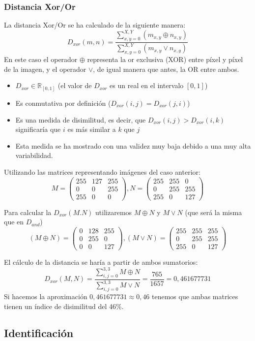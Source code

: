 \subsubsection{Distancia Xor/Or}
La distancia Xor/Or se ha calculado de la siguiente manera:
\[
D_{xor}(m,n)=\frac{ \sum_{x,y=0}^{X,Y}(m_{x,y} \oplus n_{x,y}) }{ \sum_{x,y=0}^{X,Y}(m_{x,y} \vee n_{x,y}) }
\]
En este caso el operador $\oplus$ representa la or exclusiva (XOR) entre píxel y píxel de la imagen, y el operador $\vee$, de igual manera que antes, la OR entre ambos.
\begin{itemize}
	\item{$D_{xor}\in\mathbb{R}_{\left[0,1\right]}$ (el valor de $D_{xor}$ es un real en el intervalo $\left[0,1\right]$)} 
	\item{Es conmutativa por definición ($D_{xor}(i,j)=D_{xor}(j,i)$)}
	\item{Es una medida de disimilitud, es decir, que $D_{xor}(i,j) > D_{xor} (i,k)$ significaría que $i$ es más similar a $k$ que $j$}
	\item{Esta medida se ha mostrado con una validez muy baja debido a una muy alta variabilidad.}

\end{itemize}
Utilizando las matrices representando imágenes del caso anterior:
\[ M=\left( \begin{array}{lcr}
	255 & 127 & 255 \\
	0 & 0 & 255 \\
	255 & 0 & 0 
\end{array} \right), N=\left( \begin{array}{lcr}
	255 & 255 & 0 \\
	0 & 255 & 255 \\
	255 & 0 & 127 
\end{array} \right) 
\]

Para calcular la $D_{xor}(M.N)$ utilizaremos $M \oplus N$ y $M \vee N$ (que será la misma que en $D_{and}$)
\[ (M \oplus N)=\left( \begin{array}{lcr}
	0 & 128 & 255 \\
	0 & 255 & 0 \\
	0 & 0 & 127 
\end{array} \right), (M \vee N)=\left( \begin{array}{lcr}
	255 & 255 & 255 \\
	0 & 255 & 255 \\
	255 & 0 & 127 
\end{array} \right) 
\]

El cálculo de la distancia se haría a partir de ambos sumatorios:
\[D_{xor}(M,N) = \frac 
	{\sum_{i,j=0}^{3,3} M \oplus N} 
	{\sum_{i,j=0}^{3,3} M \vee N} = \frac {765}{1657} = 0,461677731
\]
Si hacemos la aproximación $ 0,461677731 \approx 0,46 $ tenemos que ambas matrices tienen un índice de disimilitud del 46\%.


\subsection{Identificación}

